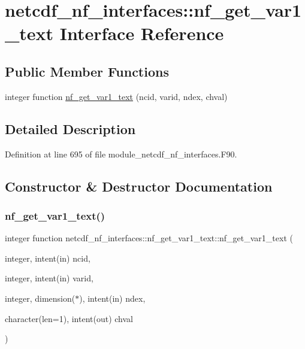 \hypertarget{interfacenetcdf__nf__interfaces_1_1nf__get__var1__text}{}\section{netcdf\+\_\+nf\+\_\+interfaces\+:\+:nf\+\_\+get\+\_\+var1\+\_\+text Interface Reference}
\label{interfacenetcdf__nf__interfaces_1_1nf__get__var1__text}
\subsection*{Public Member Functions}
\begin{DoxyCompactItemize}
\item 
integer function \hyperlink{interfacenetcdf__nf__interfaces_1_1nf__get__var1__text_a9a46cb323a305048445f432f69fe5f4e}{nf\+\_\+get\+\_\+var1\+\_\+text} (ncid, varid, ndex, chval)
\end{DoxyCompactItemize}


\subsection{Detailed Description}


Definition at line 695 of file module\+\_\+netcdf\+\_\+nf\+\_\+interfaces.\+F90.



\subsection{Constructor \& Destructor Documentation}
\mbox{\label{interfacenetcdf__nf__interfaces_1_1nf__get__var1__text_a9a46cb323a305048445f432f69fe5f4e}} 
\subsubsection{\texorpdfstring{nf\+\_\+get\+\_\+var1\+\_\+text()}{nf\_get\_var1\_text()}}
{\footnotesize\ttfamily integer function netcdf\+\_\+nf\+\_\+interfaces\+::nf\+\_\+get\+\_\+var1\+\_\+text\+::nf\+\_\+get\+\_\+var1\+\_\+text (\begin{DoxyParamCaption}\item[{integer, intent(in)}]{ncid,  }\item[{integer, intent(in)}]{varid,  }\item[{integer, dimension($\ast$), intent(in)}]{ndex,  }\item[{character(len=1), intent(out)}]{chval }\end{DoxyParamCaption})}



